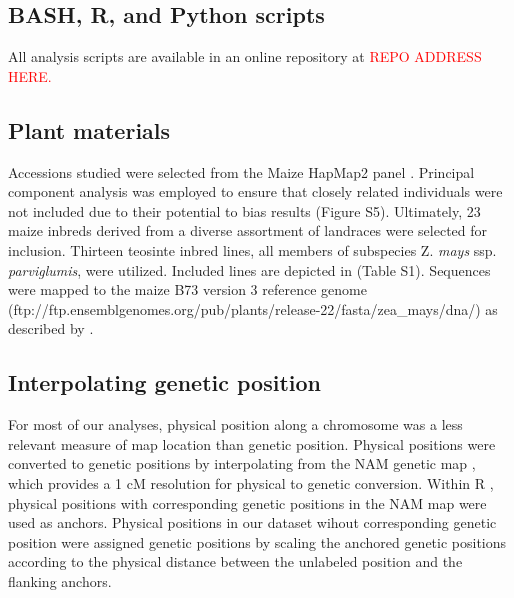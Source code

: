\documentclass{pnastwo}
\begin{document}
\begin{article}
\begin{materials}

  \subsection{BASH, R, and Python scripts}
All analysis scripts are available in an online repository at \textcolor{red}{REPO ADDRESS HERE.}

\subsection{Plant materials}
Accessions studied were selected from the Maize HapMap2
panel \cite{chia2012, lemmon2014}. Principal component analysis was employed to ensure that closely related individuals were not included due to their potential to bias results (Figure S5). Ultimately, 23 maize inbreds derived from a diverse assortment of landraces were selected for inclusion. 
Thirteen teosinte inbred lines, all members of  subspecies Z. \emph{mays}
ssp. \emph{parviglumis}, were utilized. Included lines are depicted in (Table S1).
Sequences were mapped to the maize B73 version 3 reference genome \cite{schnable2009} (ftp://ftp.ensemblgenomes.org/pub/plants/release-22/fasta/zea\_mays/dna/) as described by \cite{chia2012}.

\subsection{Interpolating genetic position}
For most of our analyses, physical position along a chromosome was a less relevant measure of map location than genetic position.
Physical positions were converted to genetic positions by interpolating from the NAM genetic map \cite{glaubitz2014}, which provides a 1 cM resolution for physical to genetic conversion.
Within R \cite{R2014}, physical positions with corresponding genetic positions in the NAM map were used as anchors.
Physical positions in our dataset wihout corresponding genetic position were assigned genetic positions by scaling the anchored genetic positions according to the physical distance between the unlabeled position and the flanking anchors.


\end{materials}
\end{article}
\end{document}
